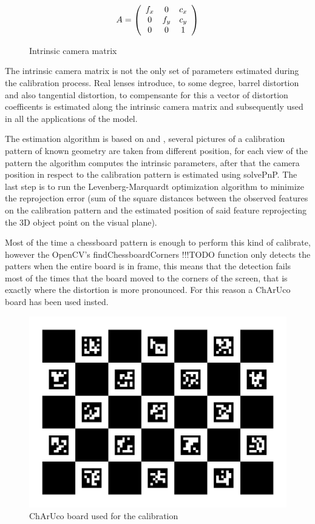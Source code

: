 \begin{figure}[h]
\caption{Intrinsic camera matrix}
\label{fig:camera_matrix}
\[A = \left (
  \begin{array}{ c c c}
  f_x & 0   & c_x \\
   0  & f_y & c_y \\
   0  & 0   & 1 \\
  \end{array}
\right )\]
\end{figure}


The intrinsic camera matrix is not the only set of parameters estimated during the calibration process. Real lenses introduce, to some degree, barrel distortion and also tangential distortion, to compensante for this a vector of distortion coefficents is estimated along the intrinsic camera matrix and subsequently used in all the applications of the model.\newline


The estimation algorithm is based on \cite{888718} and \cite{matlab}, several pictures of a calibration pattern of known geometry are taken from different position, for each view of the pattern the algorithm computes the intrinsic parameters, after that the camera position in respect to the calibration pattern is estimated using solvePnP\cite{opencvsolvepnp}. The last step is to run the Levenberg-Marquardt optimization algorithm to minimize the reprojection error (sum of the square distances between the observed features on the calibration pattern and the estimated position of said feature reprojecting the 3D object point on the visual plane).

Most of the time a chessboard pattern is enough to perform this kind of calibrate, however the OpenCV's findChessboardCorners !!!TODO function only detects the patters when the entire board is in frame, this means that the detection fails most of the times that the board moved to the corners of the screen, that is exactly where the distortion is more pronounced. For this reason a ChArUco board has been used insted.

\begin{figure}[h]
  \centering
  \includegraphics[scale=0.15]{figures/charucoboard.png}
  \caption{ChArUco board used for the calibration}
  \label{img:ch_board}
\end{figure}


